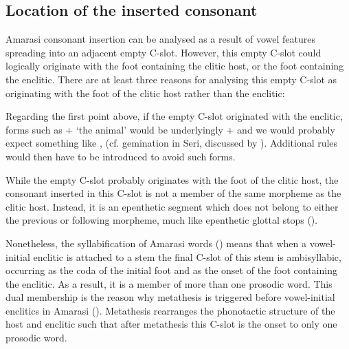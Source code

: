 \subsection{Location of the inserted consonant}\label{sec:LocInsCon}
Amarasi consonant insertion can be analysed as a result of
vowel features spreading into an adjacent empty C-slot.
However, this empty C-slot could logically originate with the foot containing the clitic host,
or the foot containing the enclitic.
There are at least three reasons for analysing this empty C-slot
as originating with the foot of the clitic host rather than the enclitic:

\begin{exe}
\end{exe}

Regarding the first point above, if the empty C-slot originated with the enclitic, forms such as
+ `the animal' {\ra}  would be underlyingly
+ and we would probably expect something like ,
(cf. gemination in Seri, discussed by \citealt[631]{mast83}).
Additional rules would then have to be introduced to avoid such forms.

While the empty C-slot probably originates with the foot of the clitic host,
the consonant inserted in this C-slot
is not a member of the same morpheme as the clitic host.
Instead, it is an epenthetic segment which does not
belong to either the previous or following morpheme,
much like epenthetic glottal stops ().

Nonetheless, the syllabification of Amarasi words ()
means that when a vowel-initial enclitic is attached to a stem
the final C-slot of this stem is ambisyllabic,
occurring as the coda of the initial foot
and as the onset of the foot containing the enclitic.
As a result, it is a member of more than one prosodic word.
This dual membership is the reason why metathesis
is triggered before vowel-initial enclitics in Amarasi ().
Metathesis rearranges the phonotactic structure
of the host and enclitic such that after
metathesis this C-slot is the onset to only one prosodic word.
